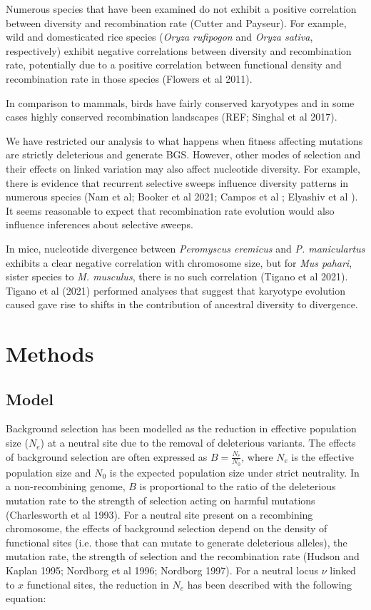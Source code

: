 \documentclass[10pt,twoside, twocolumn]{GSA_format}
\begin{document}


Numerous species that have been examined do not exhibit a positive correlation between diversity and recombination rate (Cutter and Payseur). For example, wild and domesticated rice species (\textit{Oryza rufipogon} and \textit{Oryza sativa}, respectively) exhibit negative correlations between diversity and recombination rate, potentially due to a positive correlation between functional density and recombination rate in those species (Flowers et al 2011). 

In comparison to mammals, birds have fairly conserved karyotypes and in some cases highly conserved recombination landscapes (REF; Singhal et al 2017). 



We have restricted our analysis to what happens when fitness affecting mutations are strictly deleterious and generate BGS. However, other modes of selection and their effects on linked variation may also affect nucleotide diversity. For example, there is evidence that recurrent selective sweeps influence diversity patterns in numerous species (Nam et al; Booker et al 2021; Campos et al ; Elyashiv et al ). It seems reasonable to expect that recombination rate evolution would also influence inferences about selective sweeps.  


In mice, nucleotide divergence between \textit{Peromyscus eremicus} and \textit{P. maniculartus} exhibits a clear negative correlation with chromosome size, but for \textit{Mus pahari}, sister species to \textit{M. musculus}, there is no such correlation (Tigano et al 2021). Tigano et al (2021) performed analyses that suggest that karyotype evolution caused gave rise to shifts in the contribution of ancestral diversity to divergence. 

\section{Methods}
\subsection{Model}
Background selection has been modelled as the reduction in effective population size ($N_e$) at a neutral site due to the removal of deleterious variants. The effects of background selection are often expressed as $B = \frac{N_e}{N_0}$, where $N_e$ is the effective population size and $N_0$ is the expected population size under strict neutrality. In a non-recombining genome, $B$ is proportional to the ratio of the deleterious mutation rate to the strength of selection acting on harmful mutations (Charlesworth et al 1993). For a neutral site present on a recombining chromosome, the effects of background selection depend on the density of functional sites (i.e. those that can mutate to generate deleterious alleles), the mutation rate, the strength of selection and the recombination rate (Hudson and Kaplan 1995; Nordborg et al 1996; Nordborg 1997). For a neutral locus $\nu$ linked to $x$ functional sites, the reduction in $N_e$ has been described with the following equation:
\end{document}
